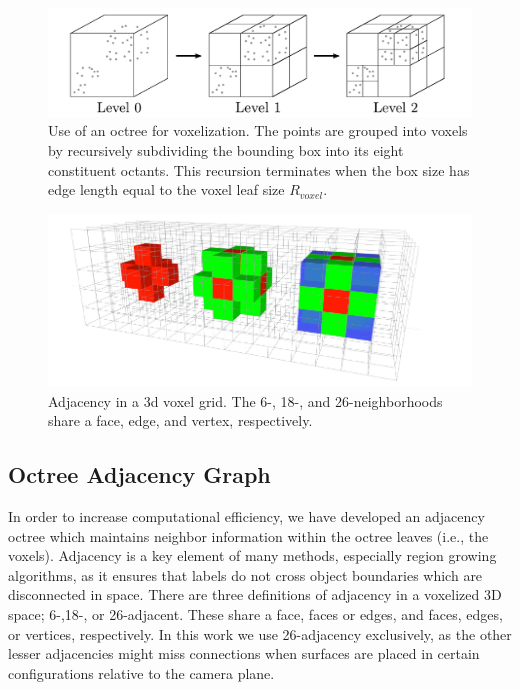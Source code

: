 \begin{figure}[!t]
\begin{center}
\includegraphics[width=\linewidth]{figures/WorldModel/voxel_grid_octree.png}
\end{center}
   \caption[Octree Voxelization]{Use of an octree for voxelization. The points are grouped into voxels by recursively subdividing the bounding box into its eight constituent octants. This recursion terminates when the box size has edge length equal to the voxel leaf size ${R}_{voxel}$.}
\label{fig:stanford_bunny}
\end{figure}

\begin{figure}[!t]
\begin{center}
\includegraphics[width=0.9\linewidth]{figures/WorldModel/3d_nearest_neigh.png}
\end{center}
   \caption[Adjacency in a 3d Grid]{Adjacency in a 3d voxel grid. The 6-, 18-, and 26-neighborhoods share a face, edge, and vertex, respectively.}
\label{fig:3d_adjacency}
\end{figure}

\subsection{Octree Adjacency Graph}
\label{subsec:Adjacency}
In order to increase computational efficiency, we have developed an adjacency octree which maintains neighbor information within the octree leaves (i.e., the voxels). Adjacency is a key element of many methods, especially region growing algorithms, as it ensures that labels do not cross object boundaries which are disconnected in space. There are three definitions of adjacency in a voxelized 3D space; 6-,18-, or 26-adjacent. These share a face, faces or edges, and faces, edges, or vertices, respectively. In this work we use 26-adjacency exclusively, as the other lesser adjacencies might miss connections when surfaces are placed in certain configurations relative to the camera plane.

